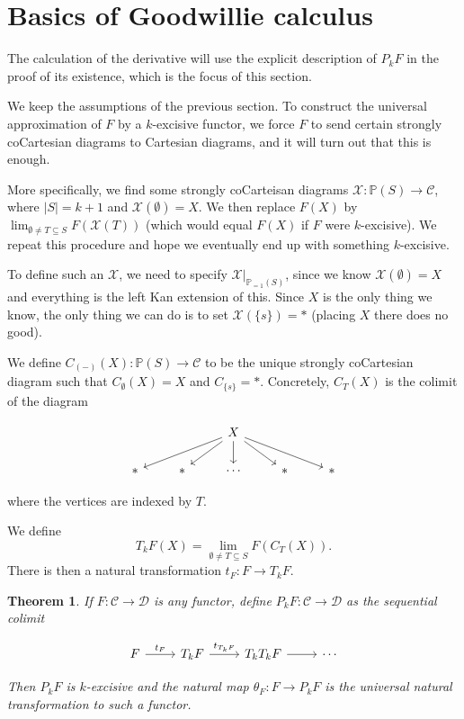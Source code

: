 \documentclass{shortart}
\newtheorem{thm}[lemma]{Theorem}
\theoremstyle{definition}
\newcommand\lims{\lim_{\emptyset \neq T \subseteq S}}
\renewcommand\P{\mathbb{P}}
\begin{document}
\section{Basics of Goodwillie calculus}
The calculation of the derivative will use the explicit description of $P_k F$ in the proof of its existence, which is the focus of this section.

We keep the assumptions of the previous section. To construct the universal approximation of $F$ by a $k$-excisive functor, we force $F$ to send certain strongly coCartesian diagrams to Cartesian diagrams, and it will turn out that this is enough.

More specifically, we find some strongly coCarteisan diagrams $\mathcal{X}: \P(S) \to \mathcal{C}$, where $|S| = k + 1$ and $\mathcal{X}(\emptyset) = X$. We then replace $F(X)$ by $\lims F(\mathcal{X}(T))$ (which would equal $F(X)$ if $F$ were $k$-excisive). We repeat this procedure and hope we eventually end up with something $k$-excisive.

To define such an $\mathcal{X}$, we need to specify $\mathcal{X}|_{\P_{=1}(S)}$, since we know $\mathcal{X}(\emptyset) = X$ and everything is the left Kan extension of this. Since $X$ is the only thing we know, the only thing we can do is to set $\mathcal{X}(\{s\}) = *$ (placing $X$ there does no good).

We define $C_{(-)}(X): \P(S) \to \mathcal{C}$ to be the unique strongly coCartesian diagram such that $C_{\emptyset}(X) = X$ and $C_{\{s\}} = *$. Concretely, $C_T(X)$ is the colimit of the diagram
\begin{useimager}
  \[
    \begin{tikzcd}
      & & X \ar[dll] \ar[dl] \ar[d] \ar[dr] \ar[drr]\\
      * & * & \cdots & *& *
    \end{tikzcd}
  \]
\end{useimager}
where the vertices are indexed by $T$.

We define
\[
  T_k F(X) = \lims F(C_T(X)).
\]
There is then a natural transformation $t_F\colon F \to T_k F$.

\begin{thm}
  If $F\colon \mathcal{C} \to \mathcal{D}$ is any functor, define $P_k F\colon \mathcal{C} \to \mathcal{D}$ as the sequential colimit
  \begin{useimager}
    \[
      \begin{tikzcd}
        F \ar[r, "t_F"] & T_k F \ar[r, "t_{T_k F}"] & T_k T_k F \ar[r] & \cdots
      \end{tikzcd}
    \]
  \end{useimager}
  Then $P_k F$ is $k$-excisive and the natural map $\theta_F: F \to P_k F$ is the universal natural transformation to such a functor.
\end{thm}
\end{document}
